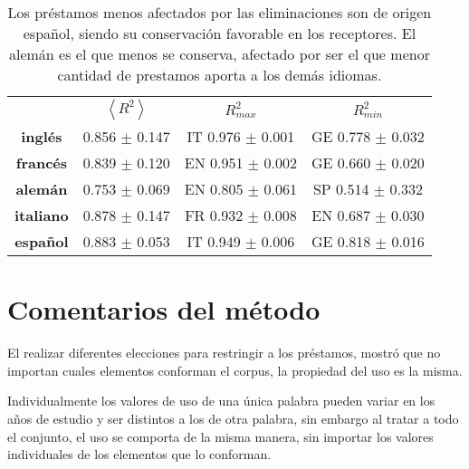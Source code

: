 \begin{table}[h!]
	\centering
	\begin{tabular}{cccc}
		\textbf{} & \textbf{$\left \langle R^{2} \right \rangle$} & \textbf{$R^{2}_{max}$} & \textbf{$R^{2}_{min}$} \\
		\textbf{inglés}   & 0.856 $\pm$ 0.147   &  IT 0.976 $\pm$ 0.001  & GE 0.778 $\pm$ 0.032  \\
		\textbf{francés}  & 0.839 $\pm$ 0.120   &  EN 0.951 $\pm$ 0.002  & GE 0.660 $\pm$ 0.020  \\
		\textbf{alemán}   & 0.753 $\pm$ 0.069   &  EN 0.805 $\pm$ 0.061  & SP 0.514 $\pm$ 0.332  \\
		\textbf{italiano} & 0.878 $\pm$ 0.147   &  FR 0.932 $\pm$ 0.008  & EN 0.687 $\pm$ 0.030  \\
		\textbf{español}  & 0.883 $\pm$ 0.053   &  IT 0.949 $\pm$ 0.006  & GE 0.818 $\pm$ 0.016                                                                
	\end{tabular}
	\caption{Los préstamos menos afectados por las eliminaciones son de origen español, siendo su conservación favorable en los receptores. El alemán es el que menos se conserva, afectado por ser el que menor cantidad de prestamos aporta a los demás idiomas.}
	\label{tab.conservacion}
\end{table}



\section{Comentarios del método}

El realizar diferentes elecciones para restringir a los préstamos, mostró que no importan cuales elementos conforman el corpus, la propiedad del uso es la misma. 

Individualmente los valores de uso de una única palabra pueden variar en los años de estudio y ser distintos a los de otra palabra, sin embargo al tratar a todo el conjunto, el uso se comporta de la misma  manera, sin importar los valores individuales de los elementos que lo conforman. 




